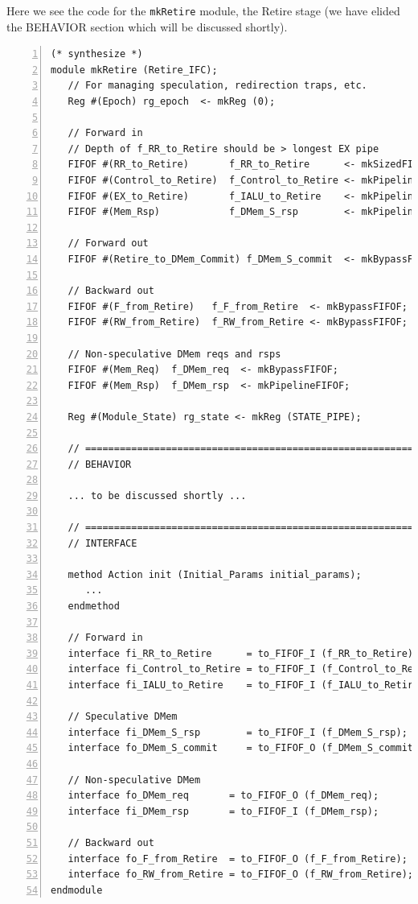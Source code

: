 Here we see the code for the \verb|mkRetire| module, the Retire stage
(we have elided the BEHAVIOR section which will be discussed shortly).

{\small
\begin{Verbatim}[frame=single, numbers=left, label=(In file:src\_Fife/S5\_Retire.bsv)]
(* synthesize *)
module mkRetire (Retire_IFC);
   // For managing speculation, redirection traps, etc.
   Reg #(Epoch) rg_epoch  <- mkReg (0);

   // Forward in
   // Depth of f_RR_to_Retire should be > longest EX pipe
   FIFOF #(RR_to_Retire)       f_RR_to_Retire      <- mkSizedFIFOF (8);
   FIFOF #(Control_to_Retire)  f_Control_to_Retire <- mkPipelineFIFOF;
   FIFOF #(EX_to_Retire)       f_IALU_to_Retire    <- mkPipelineFIFOF;
   FIFOF #(Mem_Rsp)            f_DMem_S_rsp        <- mkPipelineFIFOF;

   // Forward out
   FIFOF #(Retire_to_DMem_Commit) f_DMem_S_commit  <- mkBypassFIFOF;

   // Backward out
   FIFOF #(F_from_Retire)   f_F_from_Retire  <- mkBypassFIFOF;
   FIFOF #(RW_from_Retire)  f_RW_from_Retire <- mkBypassFIFOF;

   // Non-speculative DMem reqs and rsps
   FIFOF #(Mem_Req)  f_DMem_req  <- mkBypassFIFOF;
   FIFOF #(Mem_Rsp)  f_DMem_rsp  <- mkPipelineFIFOF;

   Reg #(Module_State) rg_state <- mkReg (STATE_PIPE);

   // ================================================================
   // BEHAVIOR

   ... to be discussed shortly ...

   // ================================================================
   // INTERFACE

   method Action init (Initial_Params initial_params);
      ...
   endmethod

   // Forward in
   interface fi_RR_to_Retire      = to_FIFOF_I (f_RR_to_Retire);
   interface fi_Control_to_Retire = to_FIFOF_I (f_Control_to_Retire);
   interface fi_IALU_to_Retire    = to_FIFOF_I (f_IALU_to_Retire);

   // Speculative DMem
   interface fi_DMem_S_rsp        = to_FIFOF_I (f_DMem_S_rsp);
   interface fo_DMem_S_commit     = to_FIFOF_O (f_DMem_S_commit);

   // Non-speculative DMem
   interface fo_DMem_req       = to_FIFOF_O (f_DMem_req);
   interface fi_DMem_rsp       = to_FIFOF_I (f_DMem_rsp);

   // Backward out
   interface fo_F_from_Retire  = to_FIFOF_O (f_F_from_Retire);
   interface fo_RW_from_Retire = to_FIFOF_O (f_RW_from_Retire);
endmodule
\end{Verbatim}
}

